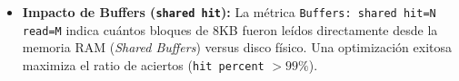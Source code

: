 \begin{engtip}
\begin{itemize}
    \item \textbf{Impacto de Buffers (\texttt{shared hit}):} La m\'etrica \texttt{Buffers: shared hit=N read=M} indica cu\'antos bloques de 8KB fueron le\'idos directamente desde la memoria RAM (\textit{Shared Buffers}) versus disco f\'isico. Una optimizaci\'on exitosa maximiza el ratio de aciertos (\texttt{hit percent} $>99\%$).
\end{itemize}
\end{engtip}
